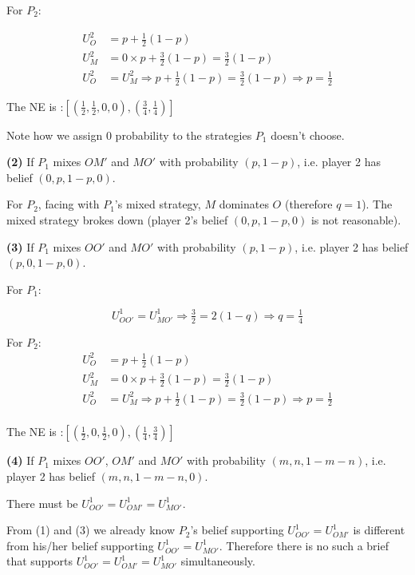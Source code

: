 \documentclass{article}
\begin{document}
For $P_2$:

\begin{align*}
U^2_{O} &= p + \tfrac12 (1-p) \\
U^2_{M} &= 0 \times p + \tfrac32 (1-p) = \tfrac32 (1-p) \\
U^2_{O} &= U^2_{M} \Rightarrow p + \tfrac12 (1-p) =  \tfrac32 (1-p) \Rightarrow p=\tfrac12
\end{align*}


The NE is :$[\left( \tfrac12, \tfrac12, 0, 0 \right), \left( \tfrac34, \tfrac14 \right)]$


\begin{mdframed}[backgroundcolor=blue!20,linecolor=white]
Note how we assign 0 probability to the strategies $P_1$ doesn't choose.
\end{mdframed}

\textbf{(2)} If $P_1$ mixes $OM'$ and $MO'$ with probability $(p,1-p)$, i.e. player 2 has belief $(0,p,1-p,0)$.

\medskip

For $P_2$, facing with $P_1$'s mixed strategy, $M$ dominates $O$ (therefore $q=1$).
The mixed strategy brokes down (player 2's belief $(0,p,1-p,0)$ is not reasonable).

\medskip

\textbf{(3)} If $P_1$ mixes $OO'$ and $MO'$ with probability $(p,1-p)$, i.e. player 2 has belief $(p,0,1-p,0)$.
\medskip

For $P_1$:

$$U^1_{OO'} = U^1_{MO'} \Rightarrow \tfrac32 =  2 (1-q)  \Rightarrow  q =\tfrac14$$

For $P_2$:
\begin{align*}
U^2_{O} &= p + \tfrac12 (1-p) \\
U^2_{M} &= 0 \times p + \tfrac32 (1-p) = \tfrac32 (1-p) \\
U^2_{O} &= U^2_{M} \Rightarrow p + \tfrac12 (1-p) = \tfrac32 (1-p) \Rightarrow p=\tfrac12 \\
\end{align*}


The NE is :$[\left( \tfrac12, 0, \tfrac12, 0 \right), \left( \tfrac14, \tfrac34 \right)]$

\medskip

\textbf{(4)} If $P_1$ mixes $OO'$, $OM'$ and $MO'$ with probability $(m,n,1-m-n)$, i.e. player 2 has belief $(m,n,1-m-n,0)$.
\medskip

There must be $U^1_{OO'} = U^1_{OM'} = U^1_{MO'}$.

From (1) and (3) we already know 
$P_2$'s belief supporting $U^1_{OO'} = U^1_{OM'}$ is different from his/her belief supporting
$U^1_{OO'} = U^1_{MO'}$. Therefore there is no such a brief that supports
$U^1_{OO'} = U^1_{OM'} = U^1_{MO'}$ simultaneously.
\end{document}
